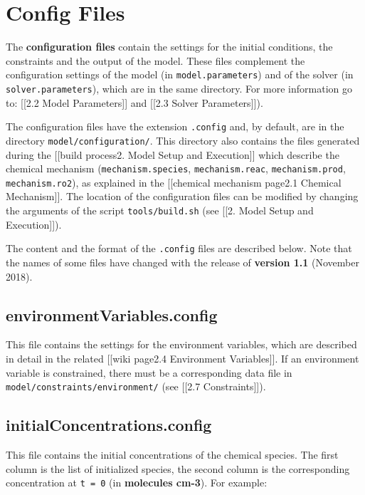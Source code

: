\section{Config Files} \label{sec:config}

The \textbf{configuration files} contain the settings for the initial
conditions, the constraints and the output of the model. These files
complement the configuration settings of the model (in
\texttt{model.parameters}) and of the solver (in
\texttt{solver.parameters}), which are in the same directory. For more
information go to: {[}{[}2.2 Model Parameters{]}{]} and {[}{[}2.3 Solver
Parameters{]}{]}).

The configuration files have the extension \texttt{.config} and, by
default, are in the directory \texttt{model/configuration/}. This
directory also contains the files generated during the {[}{[}build
process\textbar{}2. Model Setup and Execution{]}{]} which describe the
chemical mechanism (\texttt{mechanism.species}, \texttt{mechanism.reac},
\texttt{mechanism.prod}, \texttt{mechanism.ro2}), as explained in the
{[}{[}chemical mechanism page\textbar{}2.1 Chemical Mechanism{]}{]}. The
location of the configuration files can be modified by changing the
arguments of the script \texttt{tools/build.sh} (see {[}{[}2. Model
Setup and Execution{]}{]}).

The content and the format of the \texttt{.config} files are described
below. Note that the names of some files have changed with the release
of \textbf{version 1.1} (November 2018).

\subsection{environmentVariables.config}\label{environmentvariables.config}

This file contains the settings for the environment variables, which are
described in detail in the related {[}{[}wiki page\textbar{}2.4
Environment Variables{]}{]}. If an environment variable is constrained,
there must be a corresponding data file in
\texttt{model/constraints/environment/} (see {[}{[}2.7
Constraints{]}{]}).

\subsection{initialConcentrations.config}\label{initialconcentrations.config}

This file contains the initial concentrations of the chemical species.
The first column is the list of initialized species, the second column
is the corresponding concentration at \texttt{t\ =\ 0} (in
\textbf{molecules cm-3}). For example:

